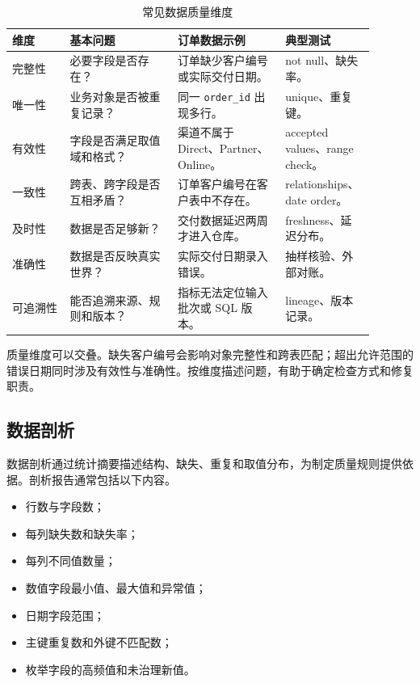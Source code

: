 \begin{table}[htbp]
\centering
\caption{常见数据质量维度}
\begin{tabular}{P{0.15\linewidth}P{0.28\linewidth}P{0.28\linewidth}P{0.18\linewidth}}
\toprule
{}
维度 & 基本问题 & 订单数据示例 & 典型测试\\
\midrule

完整性 & 必要字段是否存在？ & 订单缺少客户编号或实际交付日期。 & not null、缺失率。\\
唯一性 & 业务对象是否被重复记录？ & 同一 \texttt{order\_id} 出现多行。 & unique、重复键。\\
有效性 & 字段是否满足取值域和格式？ & 渠道不属于 Direct、Partner、Online。 & accepted values、range check。\\
一致性 & 跨表、跨字段是否互相矛盾？ & 订单客户编号在客户表中不存在。 & relationships、date order。\\
及时性 & 数据是否足够新？ & 交付数据延迟两周才进入仓库。 & freshness、延迟分布。\\
准确性 & 数据是否反映真实世界？ & 实际交付日期录入错误。 & 抽样核验、外部对账。\\
可追溯性 & 能否追溯来源、规则和版本？ & 指标无法定位输入批次或 SQL 版本。 & lineage、版本记录。\\
\bottomrule
\end{tabular}
\end{table}

质量维度可以交叠。缺失客户编号会影响对象完整性和跨表匹配；超出允许范围的错误日期同时涉及有效性与准确性。按维度描述问题，有助于确定检查方式和修复职责。

\subsection{数据剖析}

数据剖析通过统计摘要描述结构、缺失、重复和取值分布，为制定质量规则提供依据。剖析报告通常包括以下内容。
\begin{itemize}
  \item 行数与字段数；
  \item 每列缺失数和缺失率；
  \item 每列不同值数量；
  \item 数值字段最小值、最大值和异常值；
  \item 日期字段范围；
  \item 主键重复数和外键不匹配数；
  \item 枚举字段的高频值和未治理新值。
\end{itemize}

